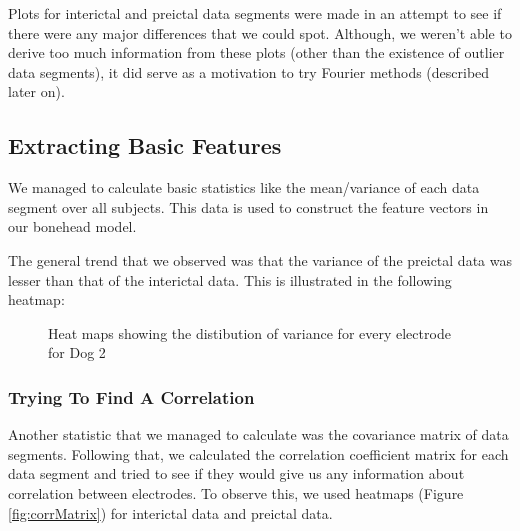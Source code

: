 \documentclass[a4paper]{article}
\begin{document}
Plots for interictal and preictal data segments were made in an attempt to see if there were any major differences that we could spot. Although, we weren't able to derive too much information from these plots (other than the existence of outlier data segments), it did serve as a motivation to try Fourier methods (described later on).

\subsection{Extracting Basic Features}
We managed to calculate basic statistics like the mean/variance of each data segment over all subjects. This data is used to construct the feature vectors in our bonehead model.

The general trend that we observed was that the variance of the preictal data was lesser than that of the interictal data. This is illustrated in the following heatmap:

\begin{figure}[H]
    \centering
    \qquad
    \caption{Heat maps showing the distibution of variance for every electrode for Dog  2}%
    \label{fig:heatvar}%
\end{figure}

\subsubsection{Trying To Find A Correlation}

Another statistic that we managed to calculate was the covariance matrix of data segments. Following that, we calculated the correlation coefficient matrix for each data segment and tried to see if they would give us any information about correlation between electrodes. To observe this, we used heatmaps (Figure \ref{fig:corrMatrix}) for interictal data and preictal data.
\end{document}
